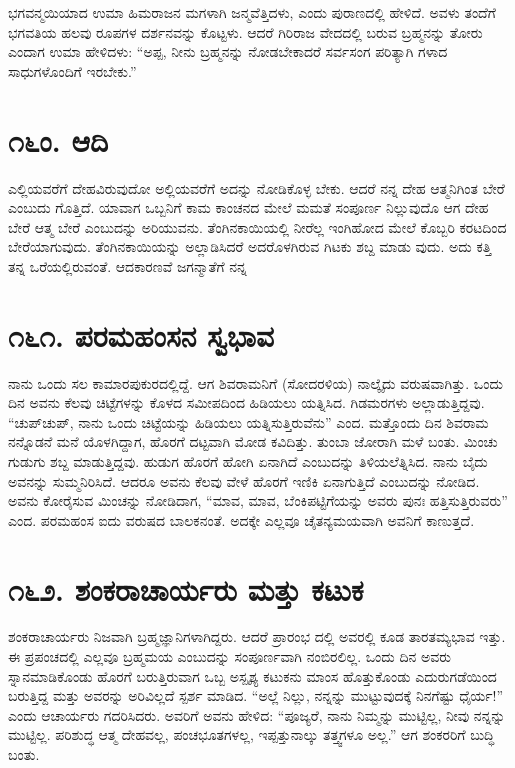 ಭಗವನ್ಮಯಿಯಾದ ಉಮಾ ಹಿಮರಾಜನ ಮಗಳಾಗಿ ಜನ್ಮವೆತ್ತಿದಳು, ಎಂದು ಪುರಾಣದಲ್ಲಿ ಹೇಳಿದೆ. ಅವಳು ತಂದೆಗೆ ಭಗವತಿಯ ಹಲವು ರೂಪಗಳ ದರ್ಶನವನ್ನು ಕೊಟ್ಟಳು. ಆದರೆ ಗಿರಿರಾಜ ವೇದದಲ್ಲಿ ಬರುವ ಬ್ರಹ್ಮನನ್ನು ತೋರು ಎಂದಾಗ ಉಮಾ ಹೇಳಿದಳು: “ಅಪ್ಪ, ನೀನು ಬ್ರಹ್ಮನನ್ನು ನೋಡಬೇಕಾದರೆ ಸರ್ವಸಂಗ ಪರಿತ್ಯಾಗಿ ಗಳಾದ ಸಾಧುಗಳೊಂದಿಗೆ ಇರಬೇಕು.”


\section{\num{೧೬ಂ. } ಆದಿ}

ಎಲ್ಲಿಯವರೆಗೆ ದೇಹವಿರುವುದೋ ಅಲ್ಲಿಯವರೆಗೆ ಅದನ್ನು ನೋಡಿಕೊಳ್ಳ ಬೇಕು. ಆದರೆ ನನ್ನ ದೇಹ ಆತ್ಮನಿಗಿಂತ ಬೇರೆ ಎಂಬುದು ಗೊತ್ತಿದೆ. ಯಾವಾಗ ಒಬ್ಬನಿಗೆ ಕಾಮ ಕಾಂಚನದ ಮೇಲೆ ಮಮತೆ ಸಂಪೂರ್ಣ ನಿಲ್ಲುವುದೊ ಆಗ ದೇಹ ಬೇರೆ ಆತ್ಮ ಬೇರೆ ಎಂಬುದನ್ನು ಅರಿಯುವನು. ತೆಂಗಿನಕಾಯಿಯಲ್ಲಿ ನೀರೆಲ್ಲ ಇಂಗಿಹೋದ ಮೇಲೆ ಕೊಬ್ಬರಿ ಕರಟದಿಂದ ಬೇರೆಯಾಗುವುದು. ತೆಂಗಿನಕಾಯಿಯನ್ನು ಅಲ್ಲಾಡಿಸಿದರೆ ಅದರೊಳಗಿರುವ ಗಿಟಕು ಶಬ್ದ ಮಾಡು ವುದು. ಅದು ಕತ್ತಿ ತನ್ನ ಒರೆಯಲ್ಲಿರುವಂತೆ. ಆದಕಾರಣವೆ ಜಗನ್ಮಾತೆಗೆ ನನ್ನ



\section{\num{೧೬೧. } ಪರಮಹಂಸನ ಸ್ವಭಾವ}

ನಾನು ಒಂದು ಸಲ ಕಾಮಾರಪುಕುರದಲ್ಲಿದ್ದೆ. ಆಗ ಶಿವರಾಮನಿಗೆ (ಸೋದರಳಿಯ) ನಾಲ್ಕೈದು ವರುಷವಾಗಿತ್ತು. ಒಂದು ದಿನ ಅವನು ಕೆಲವು ಚಿಟ್ಟೆಗಳನ್ನು ಕೊಳದ ಸಮೀಪದಿಂದ ಹಿಡಿಯಲು ಯತ್ನಿಸಿದ. ಗಿಡಮರಗಳು ಅಲ್ಲಾಡುತ್ತಿದ್ದವು. “ಚುಪ್​ಚುಪ್, ನಾನು ಒಂದು ಚಿಟ್ಟೆಯನ್ನು ಹಿಡಿಯಲು ಯತ್ನಿಸುತ್ತಿರುವೆನು” ಎಂದ. ಮತ್ತೊಂದು ದಿನ ಶಿವರಾಮ ನನ್ನೊಡನೆ ಮನೆ ಯೊಳಗಿದ್ದಾಗ, ಹೊರಗೆ ದಟ್ಟವಾಗಿ ಮೋಡ ಕವಿದಿತ್ತು. ತುಂಬಾ ಜೋರಾಗಿ ಮಳೆ ಬಂತು. ಮಿಂಚು ಗುಡುಗು ಶಬ್ದ ಮಾಡುತ್ತಿದ್ದವು. ಹುಡುಗ ಹೊರಗೆ ಹೋಗಿ ಏನಾಗಿದೆ ಎಂಬುದನ್ನು ತಿಳಿಯಲೆತ್ನಿಸಿದ. ನಾನು ಬೈದು ಅವನನ್ನು ಸುಮ್ಮನಿರಿಸಿದೆ. ಆದರೂ ಅವನು ಕೆಲವು ವೇಳೆ ಹೊರಗೆ ಇಣಿಕಿ ಏನಾಗುತ್ತಿದೆ ಎಂಬುದನ್ನು ನೋಡಿದ. ಅವನು ಕೋರೈಸುವ ಮಿಂಚನ್ನು ನೋಡಿದಾಗ, “ಮಾವ, ಮಾವ, ಬೆಂಕಿಪಟ್ಟಿಗೆಯನ್ನು ಅವರು ಪುನಃ ಹತ್ತಿಸುತ್ತಿರುವರು” ಎಂದ. ಪರಮಹಂಸ ಐದು ವರುಷದ ಬಾಲಕನಂತೆ. ಅದಕ್ಕೇ ಎಲ್ಲವೂ ಚೈತನ್ಯಮಯವಾಗಿ ಅವನಿಗೆ ಕಾಣುತ್ತದೆ.


\section{\num{೧೬೨. } ಶಂಕರಾಚಾರ್ಯರು ಮತ್ತು ಕಟುಕ}

ಶಂಕರಾಚಾರ್ಯರು ನಿಜವಾಗಿ ಬ್ರಹ್ಮಜ್ಞಾನಿಗಳಾಗಿದ್ದರು. ಆದರೆ ಪ್ರಾರಂಭ ದಲ್ಲಿ ಅವರಲ್ಲಿ ಕೂಡ ತಾರತಮ್ಯಭಾವ ಇತ್ತು. ಈ ಪ್ರಪಂಚದಲ್ಲಿ ಎಲ್ಲವೂ ಬ್ರಹ್ಮಮಯ ಎಂಬುದನ್ನು ಸಂಪೂರ್ಣವಾಗಿ ನಂಬಿರಲಿಲ್ಲ. ಒಂದು ದಿನ ಅವರು ಸ್ನಾನಮಾಡಿಕೊಂಡು ಹೊರಗೆ ಬರುತ್ತಿರುವಾಗ ಒಬ್ಬ ಅಸ್ಪೃಶ್ಯ ಕಟುಕನು ಮಾಂಸ ಹೊತ್ತುಕೊಂಡು ಎದುರುಗಡೆಯಿಂದ ಬರುತ್ತಿದ್ದ ಮತ್ತು ಅವರನ್ನು ಅರಿವಿಲ್ಲದೆ ಸ್ಪರ್ಶ ಮಾಡಿದ. “ಅಲ್ಲೆ ನಿಲ್ಲು, ನನ್ನನ್ನು ಮುಟ್ಟುವುದಕ್ಕೆ ನಿನಗೆಷ್ಟು ಧೈರ್ಯ!” ಎಂದು ಆಚಾರ್ಯರು ಗದರಿಸಿದರು. ಅವರಿಗೆ ಅವನು ಹೇಳಿದ: “ಪೂಜ್ಯರೆ, ನಾನು ನಿಮ್ಮನ್ನು ಮುಟ್ಟಿಲ್ಲ, ನೀವು ನನ್ನನ್ನು ಮುಟ್ಟಿಲ್ಲ. ಪರಿಶುದ್ಧ ಆತ್ಮ ದೇಹವಲ್ಲ, ಪಂಚಭೂತಗಳಲ್ಲ, ಇಪ್ಪತ್ತುನಾಲ್ಕು ತತ್ತ್ವಗಳೂ ಅಲ್ಲ.” ಆಗ ಶಂಕರರಿಗೆ ಬುದ್ಧಿ ಬಂತು.

